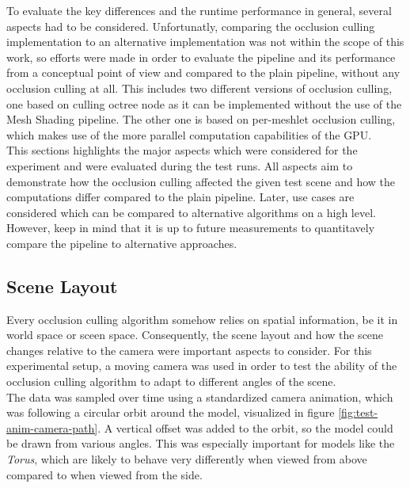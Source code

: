 To evaluate the key differences and the runtime performance in general, several aspects had to be considered.
Unfortunatly, comparing the occlusion culling implementation to an alternative implementation was not within the 
scope of this work, so efforts were made in order to evaluate the pipeline and its performance from a conceptual 
point of view and compared to the plain pipeline, without any occlusion culling at all. This includes two different 
versions of occlusion culling, one based on culling octree node as it can be implemented without the use of the 
Mesh Shading pipeline. The other one is based on per-meshlet occlusion culling, which makes use of the more parallel 
computation capabilities of the \ac{GPU}. \\

\noindent
This sections highlights the major aspects which were considered for the experiment and were evaluated during the 
test runs. All aspects aim to demonstrate how the occlusion culling affected the given test scene and how the 
computations differ compared to the plain pipeline. Later, use cases are considered which can be compared to 
alternative algorithms on a high level. However, keep in mind that it is up to future measurements to quantitavely 
compare the pipeline to alternative approaches. 


\subsection*{Scene Layout} \label{subsec-scene-layout}

Every occlusion culling algorithm somehow relies on spatial information, be it in world space or sceen space. 
Consequently, the scene layout and how the scene changes relative to the camera were important aspects to consider. 
For this experimental setup, a moving camera was used in order to test the ability of the occlusion culling 
algorithm to adapt to different angles of the scene. \\

\noindent
The data was sampled over time using a standardized camera animation, which was following a circular orbit 
around the model, visualized in figure \ref{fig:test-anim-camera-path}. A vertical offset was added to the orbit, 
so the model could be drawn from various angles. This was especially important for models like the \emph{Torus}, 
which are likely to behave very differently when viewed from above compared to when viewed from the side.

